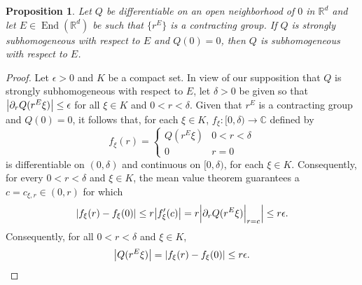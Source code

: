 \documentclass[11pt]{article}
\newtheorem{proposition}[theorem]{Proposition}
\theoremstyle{remark}
\newcommand\End{\operatorname{End}} %
\begin{document}
\begin{proposition}\label{prop:supersub_implies_sub}
Let $Q$ be differentiable on an open neighborhood of $0$ in $\mathbb{R}^d$ and let $E\in\End(\mathbb{R}^d)$ be such that $\{r^E\}$ is a contracting group. If $Q$ is strongly subhomogeneous with respect to $E$ and $Q(0)=0$, then $Q$ is subhomogeneous with respect to $E$.
\end{proposition}
\begin{proof}
Let $\epsilon>0$ and $K$ be a compact set.  In view of our supposition that $Q$ is strongly subhomogeneous with respect to $E$, let $\delta>0$ be given so that $\abs{\partial_r Q(r^E\xi)}\leq \epsilon$ for all $\xi\in K$ and $0<r< \delta$. Given that $r^E$ is a contracting group and $Q(0)=0$, it follows that, for each $\xi\in K$, $f_{\xi}:[0,\delta)\to\mathbb{C}$ defined by
\begin{equation*}
f_{\xi}(r)=\begin{cases}
Q(r^E\xi) & 0<r<\delta\\
0 & r=0
\end{cases}
\end{equation*}
is differentiable on $(0,\delta)$ and continuous on $[0,\delta)$, for each $\xi\in K$. Consequently, for every $0<r<\delta$ and $\xi\in K$, the mean value theorem guarantees a $c=c_{\xi,r}\in (0,r)$ for which 
\begin{equation*}
\abs{f_{\xi}(r)-f_{\xi}(0)}\leq r\abs{f_{\xi}'(c)}=r\abs{\partial_r Q(r^E\xi)\Big\vert_{r=c}}\leq r\epsilon.
\end{equation*}
Consequently, for all $0<r<\delta$ and $\xi\in K$,
\begin{equation*}
\abs{Q(r^E\xi)}=\abs{f_{\xi}(r)-f_{\xi}(0)}\leq r\epsilon.
\end{equation*}
\end{proof}
\end{document}
